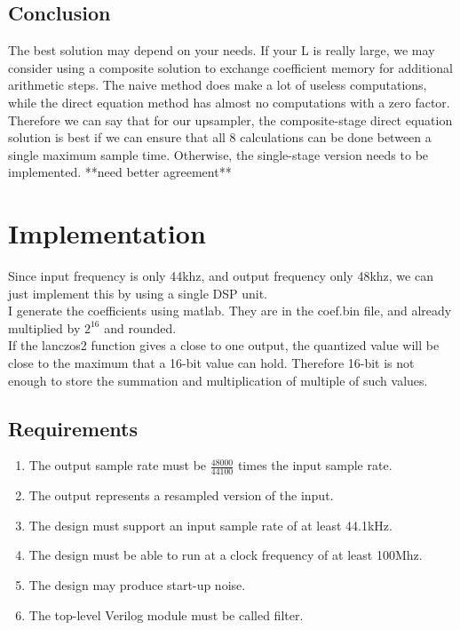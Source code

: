 \documentclass[a4paper,twoside,11pt, fleqn]{article}
\begin{document}
\subsection{Conclusion}
The best solution may depend on your needs. If your L is really large, we may consider using a composite solution to exchange coefficient memory for additional arithmetic steps. The naive method does make a lot of useless computations, while the direct equation method has almost no computations with a zero factor.\\

Therefore we can say that for our upsampler, the composite-stage direct equation solution is best if we can ensure that all 8 calculations can be done between a single maximum sample time. Otherwise, the single-stage version needs to be implemented. **need better agreement**

\newpage
\section{Implementation}
Since input frequency is only 44khz, and output frequency only 48khz, we can just implement this by using a single DSP unit.\\

I generate the coefficients using matlab. They are in the coef.bin file, and already multiplied by $2^{16}$ and rounded.\\

If the lanczos2 function gives a close to one output, the quantized value will be close to the maximum that a 16-bit value can hold. Therefore 16-bit is not enough to store the summation and multiplication of multiple of such values.\\

\subsection{Requirements}
\begin{enumerate}
	\item The output sample rate must be $\frac{48000}{44100}$ times the input sample rate.
	\item The output represents a resampled version of the input.
	\item The design must support an input sample rate of at least 44.1kHz.
	\item The design must be able to run at a clock frequency of at least 100Mhz.
	\item The design may produce start-up noise.
	\item The top-level Verilog module must be called filter.
\end{enumerate}
\end{document}

